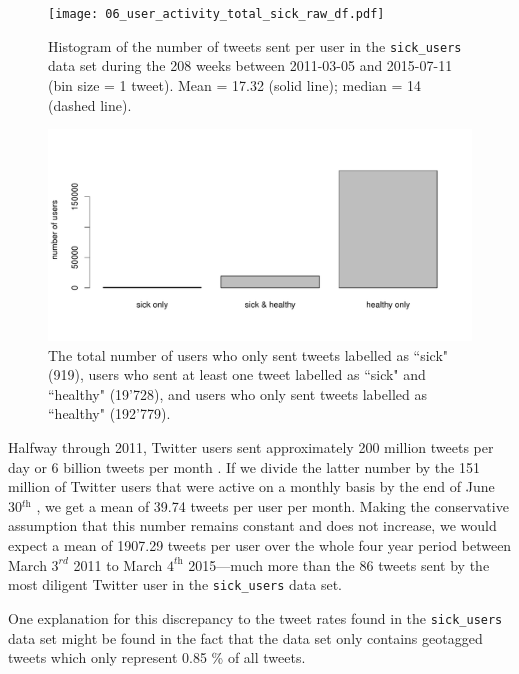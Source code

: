 \documentclass[11pt, a4paper,twoside]{report}\usepackage[]{graphicx}\usepackage[]{color}
\begin{document}
\begin{figure}[htbp!]
  \centering
    \texttt{[image: 06\_user\_activity\_total\_sick\_raw\_df.pdf]}
  \caption{Histogram of the number of tweets sent per user in the \texttt{sick\_users} data set during the 208 weeks between 2011-03-05 and 2015-07-11 (bin size = 1 tweet). Mean = 17.32 (solid line); median = 14 (dashed line).}
  \label{fig:histogram_ID_tot}
\end{figure}

\hfill

\begin{figure}[htbp!]
\centering
\includegraphics[width=1\linewidth]{07_barplot_sick_raw_df.pdf}
\caption{The total number of users who only sent tweets labelled as ``sick" (919), users who sent at least one tweet labelled as ``sick" and ``healthy" (19'728), and users who only sent tweets labelled as ``healthy" (192'779).}
\label{fig:barplot_sick_df}
\end{figure}

Halfway through 2011, Twitter users sent approximately 200 million tweets per day or 6 billion tweets per month \citep{twitter_million_2011}. If we divide the latter number by the 151 million of Twitter users that were active on a monthly basis by the end of June 30$^\textit{th}$ \citep{twitter_annual_2013}, we get a mean of 39.74 tweets per user per month. Making the conservative assumption that this number remains constant and does not increase, we would expect a mean of 1907.29 tweets per user over the whole four year period between March $3^\textit{rd}$ 2011 to March $4^\textit{th}$ 2015---much more than the 86 tweets sent by the most diligent Twitter user in the \texttt{sick\_users} data set.

One explanation for this discrepancy to the tweet rates found in the \texttt{sick\_users} data set might be found in the fact that the data set only contains geotagged tweets which only represent 0.85 \% \citep{sloan2013knowing} of all tweets. 
\end{document}
